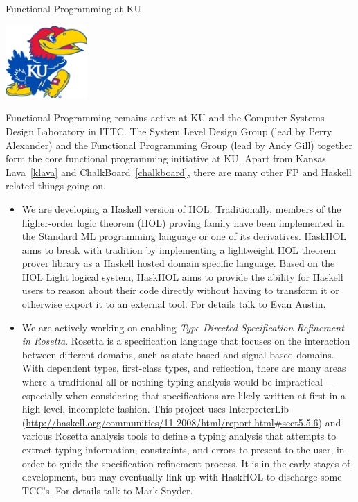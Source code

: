 \begin{hcarentry}[section]{Functional Programming at KU}
\makeheader

\begin{center}
\includegraphics[width=0.235\textwidth]{html/jh2.jpg}
\end{center}

Functional Programming remains active at KU and 
the Computer Systems Design Laboratory in ITTC.
The System Level Design Group (lead by Perry Alexander)
and the Functional Programming Group (lead by Andy Gill)
together form the core functional programming initiative at KU.
Apart from Kansas Lava~\cref{klava} and ChalkBoard~\cref{chalkboard}, there are many other
FP and Haskell related things going on.

\begin{itemize}
\item We are developing a Haskell version of HOL.
Traditionally, members of the higher-order logic theorem (HOL) proving family have
been implemented in the Standard ML programming language or one of its derivatives.
HaskHOL aims to break with tradition by implementing a lightweight HOL theorem prover
library as a Haskell hosted domain specific language. Based on the HOL Light logical
system, HaskHOL aims to provide the ability for Haskell users to reason about their
code directly without having to transform it or otherwise export it to an external
tool. For details talk to Evan Austin.

\item We are actively working on enabling {\em Type-Directed Specification Refinement in Rosetta\/}. Rosetta is a specification language that focuses on the interaction between different domains, such as state-based and signal-based domains.  With dependent types, first-class types, and reflection, there are many areas where a traditional all-or-nothing typing analysis would be impractical --- especially when considering that specifications are likely written at first in a high-level, incomplete fashion.  This project uses InterpreterLib (\url{http://haskell.org/communities/11-2008/html/report.html#sect5.5.6}) and various Rosetta analysis tools to define a typing analysis that attempts to extract typing information, constraints, and errors to present to the user, in order to guide the specification refinement process.  It is in the early stages of development, but may eventually link up with HaskHOL to discharge some TCC's. For details talk to Mark Snyder.


\end{itemize}
\end{hcarentry}
